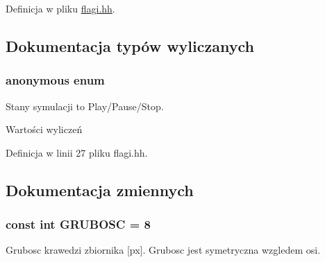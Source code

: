 Definicja w pliku \hyperlink{flagi_8hh_source}{flagi.\-hh}.



\subsection{Dokumentacja typów wyliczanych}
\hypertarget{flagi_8hh_a06fc87d81c62e9abb8790b6e5713c55b}{\subsubsection[{anonymous enum}]{\setlength{\rightskip}{0pt plus 5cm}anonymous enum}}\label{flagi_8hh_a06fc87d81c62e9abb8790b6e5713c55b}
Stany symulacji to Play/\-Pause/\-Stop. \begin{Desc}
\item[Wartości wyliczeń]\par
\begin{description}
\item[{\em 
\hypertarget{flagi_8hh_a06fc87d81c62e9abb8790b6e5713c55ba4957581ee0386c284fd318121e335af6}{e\-S\-T\-O\-P}\label{flagi_8hh_a06fc87d81c62e9abb8790b6e5713c55ba4957581ee0386c284fd318121e335af6}
}]\item[{\em 
\hypertarget{flagi_8hh_a06fc87d81c62e9abb8790b6e5713c55ba6a2f69efc37338427ecd0db296923a79}{e\-P\-A\-U\-S\-E}\label{flagi_8hh_a06fc87d81c62e9abb8790b6e5713c55ba6a2f69efc37338427ecd0db296923a79}
}]\item[{\em 
\hypertarget{flagi_8hh_a06fc87d81c62e9abb8790b6e5713c55baecdbae639704e0b7e4b5478734e45b8d}{e\-P\-L\-A\-Y}\label{flagi_8hh_a06fc87d81c62e9abb8790b6e5713c55baecdbae639704e0b7e4b5478734e45b8d}
}]\end{description}
\end{Desc}


Definicja w linii 27 pliku flagi.\-hh.



\subsection{Dokumentacja zmiennych}
\hypertarget{flagi_8hh_a359a95636f17b8e9b7a01389d75b521d}{
\subsubsection[{G\-R\-U\-B\-O\-S\-C}]{\setlength{\rightskip}{0pt plus 5cm}const int G\-R\-U\-B\-O\-S\-C = 8}}\label{flagi_8hh_a359a95636f17b8e9b7a01389d75b521d}
Grubosc krawedzi zbiornika \mbox{[}px\mbox{]}. Grubosc jest symetryczna wzgledem osi. 

